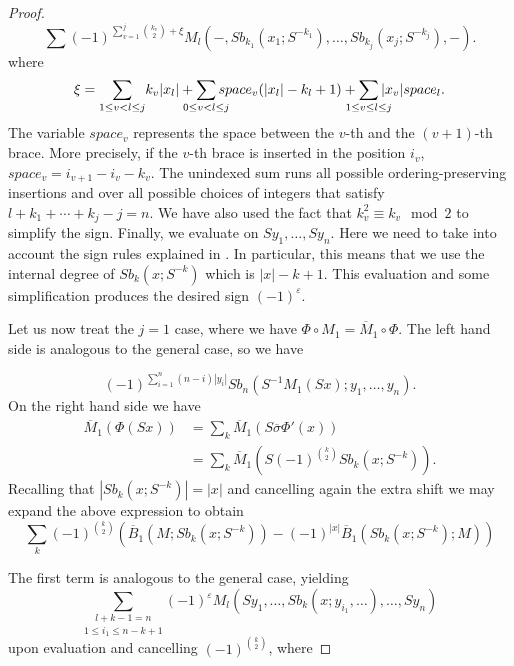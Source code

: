 \documentclass[Thesis.tex]{subfiles}
\begin{document}
\begin{proof}
\[
\sum(-1)^{\sum_{v=1}^j\binom{k_v}{2}+\xi}M_l(-,Sb_{k_1}(x_1;S^{-k_1}),\dots,Sb_{k_j}(x_j;S^{-k_j}),-).
\]
where
\begin{align*}
\xi = \underset{1\leq v<l\leq j}{\sum}k_v|x_l|+\sum_{\mathclap{0\leq v<l\leq j}}space_v(|x_l|-k_l+1)+ \sum_{\mathclap{1\leq v\leq l\leq j}} |x_v|space_l.
\end{align*}
The variable $space_v$ represents the space between the $v$-th and the $(v+1)$-th brace. More precisely, if the $v$-th brace is inserted in the position $i_v$, $space_v=i_{v+1}-i_v-k_v$. The unindexed sum runs all possible ordering-preserving insertions and over all possible choices of integers that satisfy $l+k_1+\cdots+ k_j-j=n$. We have also used the fact that $k_v^2\equiv k_v\mod 2$ to simplify the sign. Finally, we evaluate on $Sy_1,\dots, Sy_n$. Here we need to take into account the sign rules explained in . In particular, this means that we use the internal degree of $Sb_k(x;S^{-k})$ which is $|x|-k+1$. This evaluation and some simplification produces the desired sign $(-1)^{\varepsilon}$.

Let us now treat the $j=1$ case, where we have $\Phi\circ M_1=\overline{M}_1\circ\Phi$. The left hand side is analogous to the general case, so we have

\begin{equation}
(-1)^{\sum_{i=1}^n(n-i)|y_i|}Sb_n(S^{-1}M_1(Sx);y_1,\dots, y_n).
\end{equation}
On the right hand side we have
\begin{align*}
\overline{M}_1(\Phi(Sx))&=\sum_{k}\overline{M}_1(S\overline{\sigma}\Phi'(x))\\
&=\sum_{k}\overline{M}_1(S(-1)^{\binom{k}{2}}Sb_{k}(x;S^{-k})).
\end{align*}
Recalling that $|Sb_{k}(x;S^{-k})|=|x|$ and cancelling again the extra shift we may expand the above expression to obtain
\begin{equation}\label{twoterms}
\sum_{k}(-1)^{\binom{k}{2}}\left(\overline{B}_1(M;Sb_{k}(x;S^{-k}))-(-1)^{|x|}\overline{B}_1(Sb_{k}(x;S^{-k});M)\right)
\end{equation}

The first term is analogous to the general case, yielding 
\begin{equation}
\underset{1\leq i_1\leq n-k+1}{\sum_{l+k-1=n}}(-1)^{\varepsilon}M_l(Sy_1,\dots, Sb_{k}(x;y_{i_1},\dots),\dots, Sy_n)
\end{equation}
upon evaluation and cancelling $(-1)^{\binom{k}{2}}$, where 


\end{proof}
\end{document}
